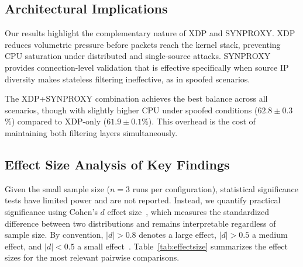 \documentclass[conference]{IEEEtran}
\begin{document}
\subsection{Architectural Implications}

Our results highlight the complementary nature of XDP and SYNPROXY.
XDP reduces volumetric pressure before packets reach the kernel stack,
preventing CPU saturation under distributed and single-source attacks.
SYNPROXY provides connection-level validation that is effective
specifically when source IP diversity makes stateless filtering
ineffective, as in spoofed scenarios.

The XDP+SYNPROXY combination achieves the best balance across all
scenarios, though with slightly higher CPU under spoofed conditions
($62.8 \pm 0.3$\%) compared to XDP-only ($61.9 \pm 0.1$\%).
This overhead is the cost of maintaining both filtering layers
simultaneously.

\subsection{Effect Size Analysis of Key Findings}

Given the small sample size ($n=3$ runs per configuration),
statistical significance tests have limited power and are not reported.
Instead, we quantify practical significance using Cohen's $d$ effect
size~\cite{cohen1988}, which measures the standardized difference between
two distributions and remains interpretable regardless of sample size.
By convention, $|d|>0.8$ denotes a large effect, $|d|>0.5$ a medium
effect, and $|d|<0.5$ a small effect~\cite{cohen1988}.
Table~\ref{tab:effectsize} summarizes the effect sizes for the most
relevant pairwise comparisons.
\end{document}
